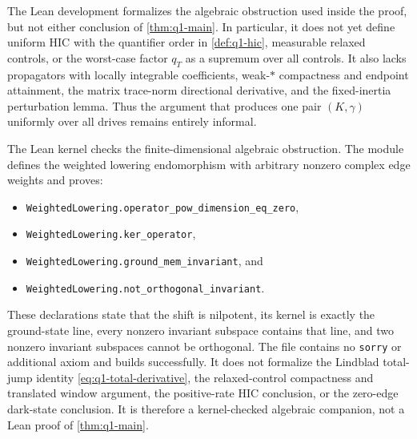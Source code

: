 \documentclass[class=article,11pt,a4paper,crop=false]{standalone}
\begin{document}
\begin{remark}\label{rem:q1-lean}
	The Lean development formalizes the algebraic obstruction used inside the
	proof, but not either conclusion of \cref{thm:q1-main}. In particular, it
	does not yet define uniform HIC with the quantifier order in
	\cref{def:q1-hic}, measurable relaxed controls, or the worst-case factor
	$q_T$ as a supremum over all controls. It also lacks propagators with locally
	integrable coefficients, weak-$*$ compactness and endpoint attainment, the
	matrix trace-norm directional derivative, and the fixed-inertia perturbation
	lemma. Thus the argument that produces one pair $(K,\gamma)$ uniformly over
	all drives remains entirely informal.
	\par\smallskip\noindent
	\par\smallskip\noindent
	The Lean kernel checks the finite-dimensional algebraic obstruction. The
	module defines the weighted lowering endomorphism with arbitrary nonzero
	complex edge weights and proves:
	\begin{itemize}[leftmargin=2em,itemsep=0pt,topsep=2pt]
		\item \nolinkurl{WeightedLowering.operator_pow_dimension_eq_zero},
		\item \nolinkurl{WeightedLowering.ker_operator},
		\item \nolinkurl{WeightedLowering.ground_mem_invariant}, and
		\item \nolinkurl{WeightedLowering.not_orthogonal_invariant}.
	\end{itemize}
	These declarations state that the shift is nilpotent, its kernel is exactly
	the ground-state line, every nonzero invariant subspace contains that line,
	and two nonzero invariant subspaces cannot be orthogonal. The file contains
	no \texttt{sorry} or additional axiom and builds successfully. It does not
	formalize the Lindblad total-jump identity
	\eqref{eq:q1-total-derivative}, the relaxed-control compactness and translated
	window argument, the positive-rate HIC conclusion, or the zero-edge dark-state
	conclusion. It is therefore a kernel-checked algebraic companion, not a Lean
	proof of \cref{thm:q1-main}.
\end{remark}

\ifstandalone
	
	
\fi
\end{document}
